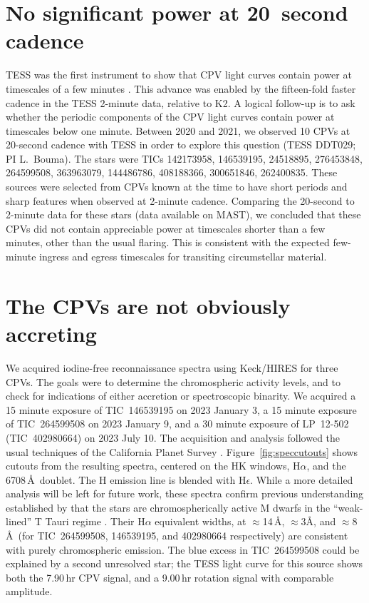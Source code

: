 \documentclass[11pt,twocolumn,tighten]{aastex63}
\begin{document}
\section{No significant power at 20~second cadence}
\label{sec:twentysec}

TESS was the first instrument to show that CPV light curves contain
power at timescales of a few minutes
\citep{2019ApJ...876..127Z,2022AJ....163..144G}.  This advance was
enabled by the fifteen-fold faster cadence in the TESS 2-minute data,
relative to K2.  A logical follow-up is to ask whether the periodic
components of the CPV light curves contain power at timescales below
one minute.  Between 2020 and 2021, we observed 10 CPVs at 20-second
cadence with TESS in order to explore this question (TESS DDT029; PI
L.~Bouma).  The stars were TICs 142173958, 146539195, 24518895,
276453848, 264599508, 363963079, 144486786, 408188366, 300651846,
262400835.  These sources were selected from CPVs known at the time to
have short periods and sharp features when observed at 2-minute
cadence.  Comparing the 20-second to 2-minute data for these stars
(data available on MAST), we concluded that these CPVs did not contain
appreciable power at timescales shorter than a few minutes, other than
the usual flaring.  This is consistent with the expected few-minute
ingress and egress timescales for transiting circumstellar material.


\section{The CPVs are not obviously accreting}
\label{sec:accretion}

We acquired iodine-free reconnaissance spectra using Keck/HIRES for
three CPVs.  The goals were to determine the chromospheric activity
levels, and to check for indications of either accretion or
spectroscopic binarity.  We acquired a 15 minute exposure of
TIC~146539195 on 2023 January 3, a 15 minute exposure of TIC~264599508
on 2023 January 9, and a 30 minute exposure of LP~12-502
(TIC~402980664) on 2023 July 10.  The acquisition and analysis
followed the usual techniques of the California Planet Survey
\citep{2010ApJ...721.1467H}.  Figure~\ref{fig:speccutouts} shows
cutouts from the resulting spectra, centered on the  HK
windows, H$\alpha$, and the  6708\,\AA\ doublet.  The
 H emission line is blended with H$\epsilon$.  While a more
detailed analysis will be left for future work, these spectra confirm
previous understanding established by \citet{2017AJ....153..152S} that
the stars are chromospherically active M dwarfs in the ``weak-lined''
T Tauri regime \citep[e.g.][Figure~15]{2019AJ....157...85B}.  Their
H$\alpha$ equivalent widths, at $\approx$14\,\AA, $\approx$3\AA, and
$\approx$8\,\AA\ (for TIC~264599508, 146539195, and 402980664
respectively) are consistent with purely chromospheric emission.  The
blue excess in TIC~264599508 could be explained by a second unresolved
star; the TESS light curve for this source shows both the 7.90\,hr CPV
signal, and a 9.00\,hr rotation signal with comparable amplitude.
\end{document}
